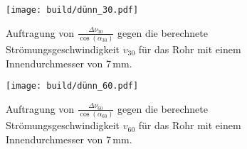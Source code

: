 \begin{figure}
  \centering
  \texttt{[image: build/dünn\_30.pdf]}
  \caption{Auftragung von $\frac{\Delta \nu_{30}}{\cos(\alpha_{30})}$ gegen die berechnete
  Strömungsgeschwindigkeit $v_{30}$ für das Rohr mit einem Innendurchmesser von 7\,mm.}
  \label{fig:dünn_30}
\end{figure}

\begin{figure}
  \centering
  \texttt{[image: build/dünn\_60.pdf]}
  \caption{Auftragung von $\frac{\Delta \nu_{60}}{\cos(\alpha_{60})}$ gegen die berechnete
  Strömungsgeschwindigkeit $v_{60}$ für das Rohr mit einem Innendurchmesser von 7\,mm.}
  \label{fig:dünn_60}
\end{figure}
